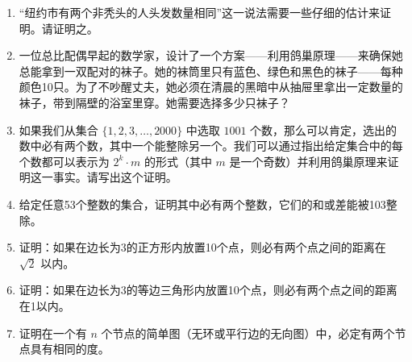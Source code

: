\begin{enumerate}

    \item “纽约市有两个非秃头的人头发数量相同”这一说法需要一些仔细的估计来证明。请证明之。
    
    \wbvfill
    
    \item 一位总比配偶早起的数学家，设计了一个方案——利用鸽巢原理——来确保她总能拿到一双配对的袜子。她的袜筒里只有蓝色、绿色和黑色的袜子——每种颜色10只。为了不吵醒丈夫，她必须在清晨的黑暗中从抽屉里拿出一定数量的袜子，带到隔壁的浴室里穿。她需要选择多少只袜子？
    
    \wbvfill
    
    \workbookpagebreak
    
    \item 如果我们从集合 $\{1, 2, 3, \ldots, 2000\}$ 中选取 $1001$ 个数，那么可以肯定，选出的数中必有两个数，其中一个能整除另一个。我们可以通过指出给定集合中的每个数都可以表示为 $2^k \cdot m$ 的形式（其中 $m$ 是一个奇数）并利用鸽巢原理来证明这一事实。请写出这个证明。
    
    \wbvfill
    
    \item 给定任意53个整数的集合，证明其中必有两个整数，它们的和或差能被103整除。
    \wbvfill
    
    \workbookpagebreak
    
    \item 证明：如果在边长为3的正方形内放置10个点，则必有两个点之间的距离在 $\sqrt{2}$ 以内。
    \wbvfill
    
    \item 证明：如果在边长为3的等边三角形内放置10个点，则必有两个点之间的距离在1以内。
    \wbvfill
    
    \workbookpagebreak
    
    \item 证明在一个有 $n$ 个节点的简单图（无环或平行边的无向图）中，必定有两个节点具有相同的度。
    \wbvfill
    
    \workbookpagebreak
    
    \end{enumerate}
    
    
